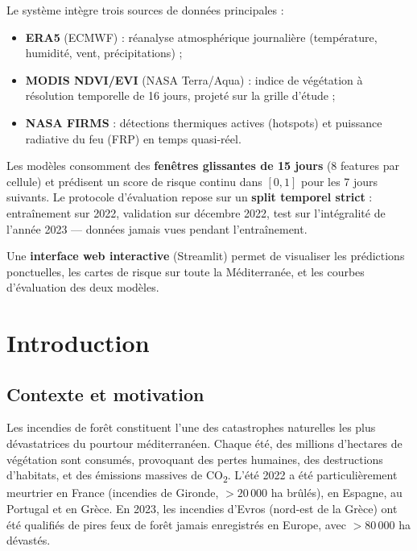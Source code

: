 \documentclass[12pt,a4paper]{report}
\begin{document}
\vspace{0.5cm}

Le système intègre trois sources de données principales :
\begin{itemize}[leftmargin=*,itemsep=2pt]
  \item \textbf{ERA5} (ECMWF) : réanalyse atmosphérique journalière (température,
        humidité, vent, précipitations) ;
  \item \textbf{MODIS NDVI/EVI} (NASA Terra/Aqua) : indice de végétation à résolution
        temporelle de 16 jours, projeté sur la grille d'étude ;
  \item \textbf{NASA FIRMS} : détections thermiques actives (hotspots) et puissance
        radiative du feu (FRP) en temps quasi-réel.
\end{itemize}

Les modèles consomment des \textbf{fenêtres glissantes de 15 jours} (8 features par
cellule) et prédisent un score de risque continu dans $[0,1]$ pour les 7 jours suivants.
Le protocole d'évaluation repose sur un \textbf{split temporel strict} : entraînement sur
2022, validation sur décembre 2022, test sur l'intégralité de l'année 2023 — données
jamais vues pendant l'entraînement.

Une \textbf{interface web interactive} (Streamlit) permet de visualiser les prédictions
ponctuelles, les cartes de risque sur toute la Méditerranée, et les courbes d'évaluation
des deux modèles.

\clearpage

\chapter{Introduction}

\section{Contexte et motivation}

Les incendies de forêt constituent l'une des catastrophes naturelles les plus dévastatrices
du pourtour méditerranéen. Chaque été, des millions d'hectares de végétation sont consumés,
provoquant des pertes humaines, des destructions d'habitats, et des émissions massives de
CO\textsubscript{2}. L'été 2022 a été particulièrement meurtrier en France (incendies de
Gironde, $>20\,000$ ha brûlés), en Espagne, au Portugal et en Grèce. En 2023, les incendies
d'Evros (nord-est de la Grèce) ont été qualifiés de pires feux de forêt jamais enregistrés
en Europe, avec $>80\,000$ ha dévastés.
\end{document}
